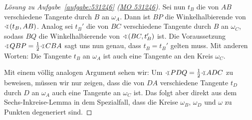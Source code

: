 \begin{proof}[Lösung zu Aufgabe~\ref{aufgabe:531246} \textmd{(\href{https://www.mathematik-olympiaden.de/moev/index.php?option=com_download&thema=a&datei=A53124b.pdf&format=raw}{MO 531246})}]
	Sei nun $t_B$ die von $AB$ verschiedene Tangente durch $B$ an $\omega_A$. Dann ist $BP$ die Winkelhalbierende von $\winkel (t_B,AB)$. Analog sei $t_B'$ die von $BC$ verschiedene Tangente durch $B$ an $\omega_C$, sodass $BQ$ die Winkelhalbierende von $\winkel (BC,t_B')$ ist. Die Voraussetzung $\winkel QBP=\frac12\winkel CBA$ sagt uns nun genau, dass $t_B=t_B'$ gelten muss. Mit anderen Worten: Die Tangente $t_B$ an $\omega_A$ ist auch eine Tangente an den Kreis $\omega_C$.
	
	Mit einem völlig analogen Argument sehen wir: Um $\winkel PDQ=\frac12\winkel ADC$ zu beweisen, müssen wir nur zeigen, dass die von $DA$ verschiedene Tangente $t_D$ durch $D$ an $\omega_A$ auch eine Tangente an $\omega_C$ ist. Das folgt aber direkt aus dem Sechs-Inkreise-Lemma in dem Spezialfall, dass die Kreise $\omega_B$, $\omega_D$ und $\omega$ zu Punkten degeneriert sind.
\end{proof}